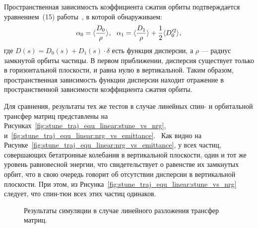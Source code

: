 Пространственная зависимость коэффициента сжатия орбиты подтверждается уравнением~(15) работы~\cite{Senichev:IPAC13}, в которой обнаруживаем:
\[
\alpha_0 = \avg{\frac{D_0}{\rho}},~~ \alpha_1 = \avg{\frac{D_1}{\rho}} + \frac12\avg{D_0'^2},
\]
где $D(s) = D_0(s) + D_1(s)\cdot \delta$  есть функция дисперсии, а $\rho$ --- радиус замкнутой орбиты частицы.
В первом приближении, дисперсия существует только в горизонтальной плоскости, и равна нулю в вертикальной. Таким образом, пространственная зависимость функции дисперсии находит отражение в пространственной зависимости коэффициента сжатия орбиты.

Для сравнения, результаты тех же тестов в случае линейных спин- и орбитальной трансфер матриц представлены на Рисунках~\ref{fig:stune_traj_equ_linear:stune_vs_nrg}, и~\ref{fig:stune_traj_equ_linear:nrg_vs_emittance}.  Как видно на Рисунке~\ref{fig:stune_traj_equ_linear:nrg_vs_emittance}, у всех частиц, совершающих бетатронные колебания в вертикальной плоскости, один и тот же уровень равновесной энергии, что свидетельствует о равенстве их замкнутых орбит, что в свою очередь говорит об отсутствии дисперсии в вертикальной плоскости. При этом, из Рисунка~\ref{fig:stune_traj_equ_linear:stune_vs_nrg} следует, что спин-тюн всех этих частиц одинаков.

\begin{figure}[h]
	\centering
	\caption{Результаты симуляции в случае линейного разложения трансфер матриц.}
\end{figure}

